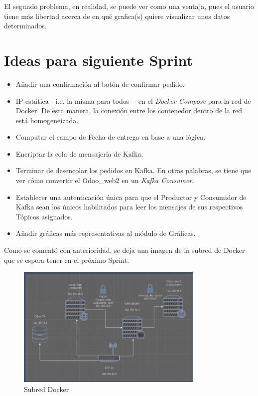 \documentclass[12pt, a4paper, twoside]{article} %
\newcommand{\ti}{\emph} %
\begin{document}
El segundo problema, en realidad, se puede ver como una ventaja, pues el usuario tiene más libertad acerca de en qué grafica(s) quiere visualizar unos datos determinados.
\section{Ideas para siguiente Sprint}

\begin{itemize}
    \item Añadir una confirmación al botón de confirmar pedido.
    \item IP estática---i.e. la misma para todos--- en el \ti{Docker-Compose} para la red de Docker. De esta manera, la conexión entre los contenedor dentro de la red está homogeneizada.
    \item Computar el campo de Fecha de entrega en base a una lógica.
    \item Encriptar la cola de mensajería de Kafka.
    \item Terminar de desencolar los pedidos en Kafka. En otras palabras, se tiene que ver cómo convertir el Odoo\_web2 en un \ti{Kafka Consumer}.
    \item Establecer una autenticación única para que el Productor y Consumidor de Kafka sean los únicos habilitados para leer los mensajes de sus respectivos Tópicos asignados.
    \item Añadir gráficas más representativas al módulo de Gráficas.
\end{itemize}

Como se comentó con anterioridad, se deja una imagen de la subred de Docker que se espera tener en el próximo Sprint.
\begin{figure}[H]
    \centering
    \includegraphics[width = 0.8\textwidth]{aa_imgs/img_arq_2}
    \caption{Subred Docker}
    \label{subred2}
\end{figure}
\end{document}
